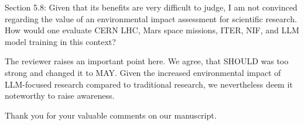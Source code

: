 \documentclass[12pt,english]{reviewresponse}
\begin{document}
\begin{revcomment}
Section 5.8: Given that its benefits are very difficult to judge, I am not convinced regarding the value of an environmental impact assessment for scientific research. How would one evaluate CERN LHC, Mars space missions, ITER, NIF, and LLM model training in this context?
\end{revcomment}
\begin{revresponse}
    The reviewer raises an important point here. We agree, that SHOULD was too strong and changed it to MAY. Given the increased environmental impact of LLM-focused research compared to traditional research, we nevertheless deem it noteworthy to raise awareness.
\end{revresponse}

\begin{concludingresponse}[]
	Thank you for your valuable comments on our manuscript. 
\end{concludingresponse}
\end{document}

